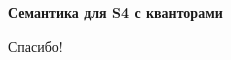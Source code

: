 \documentclass{beamer}
\begin{document}
\begin{frame}{}
\begin{center}
	\textbf{Семантика для S4 с кванторами}
\end{center}
\end{frame}






\begin{frame}{}
    \thispagestyle{empty}
    \begin{center}
        {\large Спасибо!}
    \end{center}
\end{frame}


\end{document}
